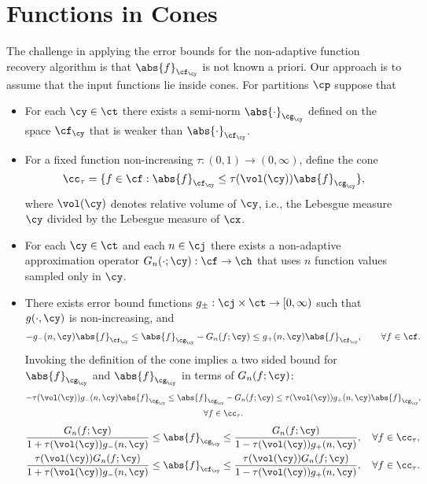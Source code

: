 \documentclass[]{elsarticle}
\theoremstyle{definition}
\theoremstyle{remark}
\newcommand{\FYnorm}[1]{\abs{#1}_{\cf_\cy}}
\newcommand{\GYnorm}[1]{\abs{#1}_{\cg_\cy}}
\begin{document}
\section{Functions in Cones}
The challenge in applying the error bounds for the non-adaptive function recovery algorithm is that $\FYnorm{f}$ is not known a priori.  Our approach is to assume that the input functions lie inside cones. For partitions $\cp$ suppose that
\begin{itemize}

\item For each $\cy \in \ct$ there exists a semi-norm $\GYnorm{\cdot}$ defined on the space $\cf_{\cy}$ that is weaker than $\FYnorm{\cdot}$.

\item For a fixed function non-increasing $\tau: (0,1) \to (0,\infty)$, define the cone
\begin{equation} \label{defcone}
\cc_{\tau} = \{ f \in \cf : \FYnorm{f} \le \tau(\vol(\cy)) \GYnorm{f} \},
\end{equation}
where $\vol(\cy)$ denotes relative volume of $\cy$, i.e., the Lebesgue measure $\cy$ divided by the Lebesgue measure of $\cx$.

\item For each $\cy \in \ct$ and each $n \in \cj$ there exists a non-adaptive approximation operator $G_n(\cdot;\cy) : \cf \to \ch$ that uses $n$ function values sampled only in $\cy$.

\item There exists error bound functions $g_{\pm}:\cj \times \ct \to [0,\infty)$ such that $g(\cdot,\cy)$ is non-increasing, and
\[
-g_{-}(n,\cy) \FYnorm{f} \le \GYnorm{f} - G_n(f;\cy) \le g_{+}(n,\cy) \FYnorm{f}, \qquad \forall f \in \cf.
\]
Invoking the definition of the cone implies a two sided bound for  $\GYnorm{f}$ and $\GYnorm{f}$ in terms of $G_n(f;\cy)$:
\begin{multline*}
-\tau(\vol(\cy)) g_{-}(n,\cy) \GYnorm{f} \le \GYnorm{f} - G_n(f;\cy) \le \tau(\vol(\cy)) g_{+}(n,\cy) \GYnorm{f}, \\ \forall f \in \cc_{\tau}.
\end{multline*}
\begin{gather*}
\frac{G_n(f;\cy)}{1+\tau(\vol(\cy)) g_{-}(n,\cy)} \le \GYnorm{f} \le \frac{G_n(f;\cy)}{1-\tau(\vol(\cy)) g_{+}(n,\cy)}, \quad \forall f \in \cc_{\tau}, \\
\frac{\tau(\vol(\cy))G_n(f;\cy)}{1+\tau(\vol(\cy)) g_{-}(n,\cy)} \le \FYnorm{f} \le \frac{\tau(\vol(\cy))G_n(f;\cy)}{1-\tau(\vol(\cy)) g_{+}(n,\cy)}, \quad \forall f \in \cc_{\tau}.
\end{gather*}

\end{itemize}
\end{document}
